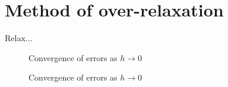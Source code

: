 \documentclass{article}
\begin{document}
\section{Method of over-relaxation}

Relax...

\begin{figure}[H]
  \begin{center}
  \end{center}
  \caption{Convergence of errors as $h\to 0$}
  \label{fig:mag_susc}
\end{figure}

\begin{figure}[H]
  \begin{center}
  \end{center}
  \caption{Convergence of errors as $h\to 0$}
  \label{fig:mag_susc}
\end{figure}
\end{document}
